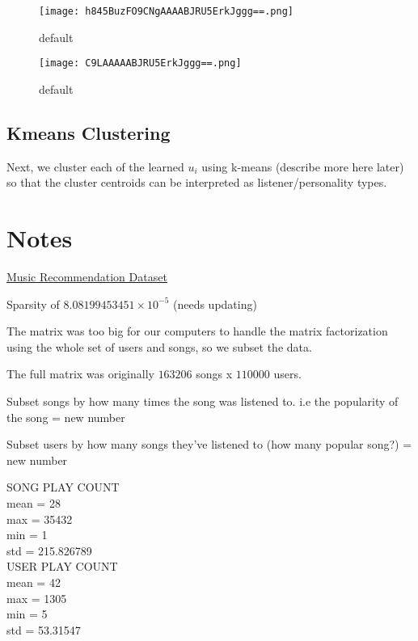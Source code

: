 \documentclass[12pt,preprint]{aastex}
\begin{document}
\begin{figure}[ht]
\begin{minipage}[b]{0.45\linewidth}
\centering
\texttt{[image: h845BuzFO9CNgAAAABJRU5ErkJggg==.png]}
\caption{default}
\label{fig:figure1}
\end{minipage}
\hspace{0.5cm}
\begin{minipage}[b]{0.45\linewidth}
\centering
\texttt{[image: C9LAAAAABJRU5ErkJggg==.png]}
\caption{default}
\label{fig:figure2}
\end{minipage}
\end{figure}

\subsection{Kmeans Clustering}
Next, we cluster each of the learned $u_i$ using k-means (describe more here later) so that the cluster centroids can be interpreted as listener/personality types.

\section{Notes}

\href{http://www.dtic.upf.edu/~ocelma/MusicRecommendationDataset/}{Music Recommendation Dataset}

Sparsity of $8.08199453451\times 10^{-5}$ (needs updating)

The matrix was too big for our computers to handle the matrix factorization using the whole set of users and songs, so we subset the data. 

The full matrix was originally $163206$ songs x $110000$ users. 

Subset songs by how many times the song was listened to. i.e the popularity of the song
= new number 

Subset users by how many songs they've listened to (how many popular song?)
= new number 

SONG PLAY COUNT  \\
mean = 28 \\
max = 35432 \\
min = 1 \\
std = 215.826789\\

USER PLAY COUNT\\
mean = 42\\
max = 1305\\
min = 5\\
std = 53.31547\\
\end{document}
